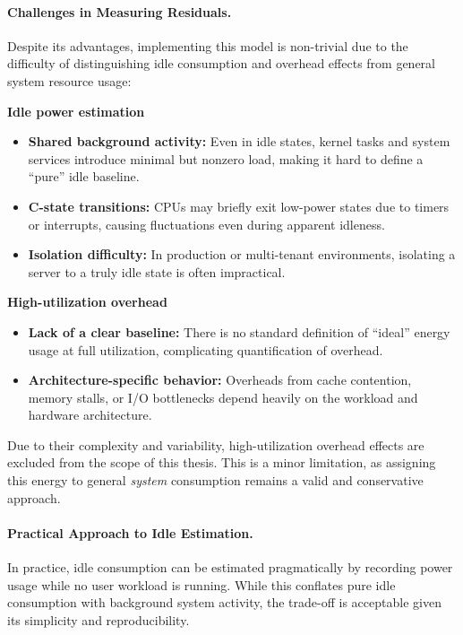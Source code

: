 \paragraph{Challenges in Measuring Residuals.}
Despite its advantages, implementing this model is non-trivial due to the difficulty of distinguishing idle consumption and overhead effects from general system resource usage:

\textbf{Idle power estimation}
\begin{itemize}
    \item \textbf{Shared background activity:} Even in idle states, kernel tasks and system services introduce minimal but nonzero load, making it hard to define a “pure” idle baseline.
    \item \textbf{C-state transitions:} CPUs may briefly exit low-power states due to timers or interrupts, causing fluctuations even during apparent idleness.
    \item \textbf{Isolation difficulty:} In production or multi-tenant environments, isolating a server to a truly idle state is often impractical.
\end{itemize}

\textbf{High-utilization overhead}
\begin{itemize}
    \item \textbf{Lack of a clear baseline:} There is no standard definition of “ideal” energy usage at full utilization, complicating quantification of overhead.
    \item \textbf{Architecture-specific behavior:} Overheads from cache contention, memory stalls, or I/O bottlenecks depend heavily on the workload and hardware architecture.
\end{itemize}

Due to their complexity and variability, high-utilization overhead effects are excluded from the scope of this thesis. This is a minor limitation, as assigning this energy to general \textit{system} consumption remains a valid and conservative approach.

\paragraph{Practical Approach to Idle Estimation.}
In practice, idle consumption can be estimated pragmatically by recording power usage while no user workload is running. While this conflates pure idle consumption with background system activity, the trade-off is acceptable given its simplicity and reproducibility.

